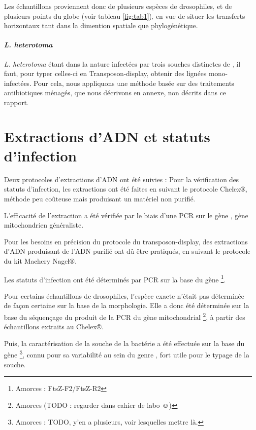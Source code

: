 	Les échantillons proviennent donc de plusieurs espèces de drosophiles, et de plusieurs points du globe (voir tableau \ref{fig:tab1}), en vue de situer les transferts horizontaux tant dans la dimention spatiale que phylogénétique.

	\paragraph{\textit{L. heterotoma}} %
	\label{par:hetero_mm}
	\textit{L. heterotoma} étant dans la nature infectées par trois souches distinctes de , il faut, pour typer celles-ci en Transposon-display, obtenir des lignées mono-infectées. Pour cela, nous appliquons une méthode basée sur des traitements antibiotiques ménagés, que nous décrivons en annexe, non décrits dans ce rapport.


\section{Extractions d'ADN et statuts d'infection} %
	Deux protocoles d'extractions d'ADN ont été suivies : 
	Pour la vérification des statuts d'infection, les extractions ont été faites en suivant le protocole Chelex®, méthode peu coûteuse mais produisant un matériel non purifié.

	L'efficacité de l'extraction a été vérifiée par le biais d'une PCR sur le gène , gène mitochondrien généraliste.

	Pour les besoins en précision du protocole du transposon-display, des extractions d'ADN produisant de l'ADN purifié ont dû être pratiqués, en suivant le protocole du kit Machery Nagel®.

	Les statuts d'infection ont été déterminés par PCR sur la base du gène \footnote{Amorces : FtsZ-F2/FtsZ-R2}.

	Pour certains échantillons de drosophiles, l'espèce exacte n'était pas déterminée de façon certaine sur la base de la morphologie. Elle a donc été déterminée sur la base du séquençage du produit de la PCR du gène mitochondrial \footnote{Amorces (TODO : regarder dans cahier de labo ☺)}, à partir des échantillons extraits au Chelex®.

	Puis, la caractérisation de la souche de la bactérie a été effectuée sur la base du gène \footnote{Amorces : TODO, y’en a plusieurs, voir lesquelles mettre là.}, connu pour sa variabilité au sein du genre , fort utile pour le typage de la souche.

